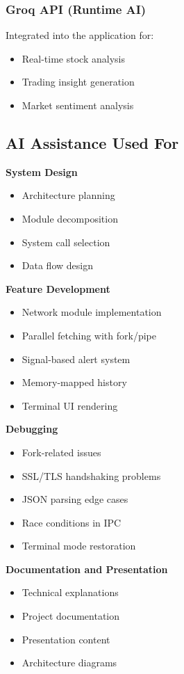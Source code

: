 \documentclass[12pt,a4paper]{article}
\begin{document}
\subsubsection{Groq API (Runtime AI)}
Integrated into the application for:
\begin{itemize}[itemsep=0.3em]
    \item Real-time stock analysis
    \item Trading insight generation
    \item Market sentiment analysis
\end{itemize}

\subsection{AI Assistance Used For}

\textbf{System Design}
\begin{itemize}[itemsep=0.3em]
    \item Architecture planning
    \item Module decomposition
    \item System call selection
    \item Data flow design
\end{itemize}

\textbf{Feature Development}
\begin{itemize}[itemsep=0.3em]
    \item Network module implementation
    \item Parallel fetching with fork/pipe
    \item Signal-based alert system
    \item Memory-mapped history
    \item Terminal UI rendering
\end{itemize}

\textbf{Debugging}
\begin{itemize}[itemsep=0.3em]
    \item Fork-related issues
    \item SSL/TLS handshaking problems
    \item JSON parsing edge cases
    \item Race conditions in IPC
    \item Terminal mode restoration
\end{itemize}

\textbf{Documentation and Presentation}
\begin{itemize}[itemsep=0.3em]
    \item Technical explanations
    \item Project documentation
    \item Presentation content
    \item Architecture diagrams
\end{itemize}
\end{document}
